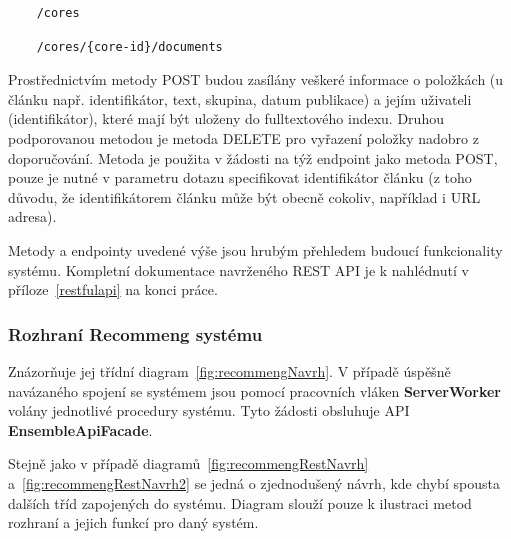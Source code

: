 \documentclass[thesis=M,czech]{FITthesis}[2014/05/07]
\begin{document}
\begin{verbatim}
	/cores
\end{verbatim}

\begin{verbatim}
	/cores/{core-id}/documents
\end{verbatim}

Prostřednictvím metody POST budou zasílány veškeré informace o položkách (u článku např. identifikátor, text, skupina, datum publikace) a jejím uživateli (identifikátor), které mají být uloženy do fulltextového indexu. Druhou podporovanou metodou je metoda DELETE pro vyřazení položky nadobro z doporučování. Metoda je použita v žádosti na týž endpoint jako metoda POST, pouze je nutné v parametru dotazu specifikovat identifikátor článku (z toho důvodu, že identifikátorem článku může být obecně cokoliv, například i URL adresa).

Metody a endpointy uvedené výše jsou hrubým přehledem budoucí funkcionality systému. Kompletní dokumentace navrženého REST API je k nahlédnutí v příloze~\ref{restfulapi} na konci práce.

\subsubsection{Rozhraní Recommeng systému}
Znázorňuje jej třídní diagram~\ref{fig:recommengNavrh}. V případě úspěšně navázaného spojení se systémem jsou pomocí pracovních vláken \textbf{ServerWorker} volány jednotlivé procedury systému. Tyto žádosti obsluhuje API \textbf{EnsembleApiFacade}.

Stejně jako v případě diagramů~\ref{fig:recommengRestNavrh} a~\ref{fig:recommengRestNavrh2} se jedná o zjednodušený návrh, kde chybí spousta dalších tříd zapojených do systému. Diagram slouží pouze k ilustraci metod rozhraní a jejich funkcí pro daný systém.
\end{document}
